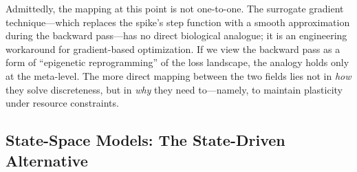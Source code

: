 \documentclass[12pt,a4paper]{article}
\begin{document}
Admittedly, the mapping at this point is not one-to-one. The surrogate gradient technique---which replaces the spike's step function with a smooth approximation during the backward pass---has no direct biological analogue; it is an engineering workaround for gradient-based optimization. If we view the backward pass as a form of ``epigenetic reprogramming'' of the loss landscape, the analogy holds only at the meta-level. The more direct mapping between the two fields lies not in \emph{how} they solve discreteness, but in \emph{why} they need to---namely, to maintain plasticity under resource constraints.

\subsection{State-Space Models: The State-Driven Alternative}
\label{sec:ssm}
\end{document}
